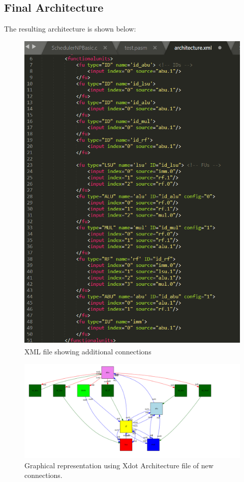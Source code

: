\documentclass[letterpaper, 10 pt, conference]{ieeeconf}  %
\begin{document}
\subsection{Final Architecture}
\label{imp:E}

The resulting architecture is shown below:

\begin{figure}[ht]
\begin{center}
\includegraphics[width=\linewidth]{images/arch01.png}
\caption{XML file showing additional connections}
\label{fig:TODO1}
\end{center}
\end{figure}

\begin{figure}[ht]
\begin{center}
\includegraphics[scale=0.35]{images/arch.png}
\caption{Graphical representation using Xdot Architecture file of new connections.}
\label{fig:TODO2}
\end{center}
\end{figure}
\end{document}
